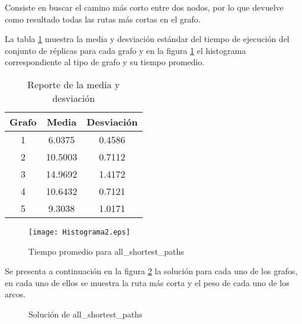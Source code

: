 \documentclass{article}
\begin{document}
Consiste en buscar el camino más corto entre dos nodos, por lo que devuelve como resultado todas las rutas más cortas en el grafo.

La tabla \ref{T2} muestra la media y desviación estándar del tiempo de ejecución del conjunto de réplicas para cada grafo y en la figura \ref{Figura2} el histograma correspondiente al tipo de grafo y su tiempo promedio.

\begin{table}[h]
\centering
\begin{tabular}{|c|c|c|}
\hline
\textbf{Grafo} & \textbf{Media} & \textbf{Desviación} \\ \hline
1              & 6.0375         & 0.4586              \\ \hline
2              & 10.5003        & 0.7112              \\ \hline
3              & 14.9692        & 1.4172              \\ \hline
4              & 10.6432        & 0.7121              \\ \hline
5              & 9.3038         & 1.0171              \\ \hline
\end{tabular}
\caption{Reporte de la media y desviación} 
\label{T2}
\end{table}

\begin{figure}[h]
\centering
\texttt{[image: Histograma2.eps]}  
\caption{Tiempo promedio para all\_shortest\_paths}
\label{Figura2}
\end{figure}

Se presenta a continuación en la figura \ref{Grafos2} la solución para cada uno de los grafos, en cada uno de ellos se muestra la ruta más corta y el peso de cada uno de los arcos. 



\begin{figure}[H]
\centering
{}\hspace{5mm}
\vspace{5mm}
\hspace{5mm}
\vspace{5mm}
\caption{Solución de all\_shortest\_paths} \label{Grafos2}
\end{figure}
\end{document}
